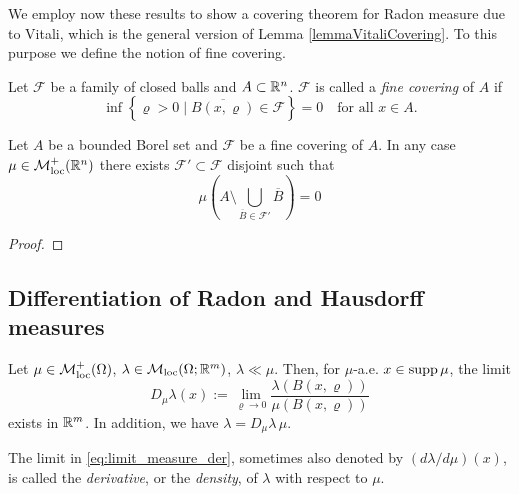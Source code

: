 We employ now these results to show a covering theorem for Radon measure due to Vitali, which is the general version of Lemma \ref{lemmaVitaliCovering}. To this purpose we define the notion of fine covering.

\begin{definition}
Let $\mathcal{F}$ be a family of closed balls and $A \subset \mathbb{R}^n$.
$\mathcal{F}$ is called a {\em fine covering} of $A$ if 
\[
\inf \left\{ \varrho > 0 \mid \overline{B(x,\varrho)} \in \mathcal{F}\right \} =
0 \quad \text{for all $x\in A$}.
\]
\end{definition}

\begin{theorem}
Let $A$ be a bounded Borel set and $\mathcal{F}$ be a fine covering of $A$. In
any case $\mu \in \mathcal{M}^+_{\rm loc}(\mathbb{R}^n)$ there exists $\mathcal{F}' \subset
\mathcal{F}$ disjoint such that 
\[
\mu \left( A \setminus \bigcup_{\overline{B}
\in \mathcal{F}'} \overline{B} \right) = 0
\]
\end{theorem}
\begin{proof}
\TODO
\end{proof}

\subsection{Differentiation of Radon and Hausdorff measures}

\begin{theorem} \label{thm:Leb_Bes_diff}
Let $\mu \in \mathcal{M}^+_{\rm loc}(\Omega)$, $\lambda \in
\mathcal{M}_{\rm loc}(\Omega;\mathbb{R}^m)$, $\lambda \ll \mu$. Then, for $\mu$-a.e. $x \in
\operatorname{supp} \mu$, the limit 
\begin{equation} \label{eq:limit_measure_der}
D_{\mu}\lambda(x) := \lim_{\varrho \to 0} \frac{\lambda(B(x,\varrho))}{\mu(B(x,\varrho))}
\end{equation}
exists in $\mathbb{R}^m$. In addition, we have $\lambda = D_{\mu}\lambda \, \mu$.
\end{theorem}

The limit in \eqref{eq:limit_measure_der}, sometimes also denoted by $(d\lambda/d\mu)(x)$, is called the {\em derivative}, or the {\em density}, of $\lambda$ with respect to $\mu$. 


